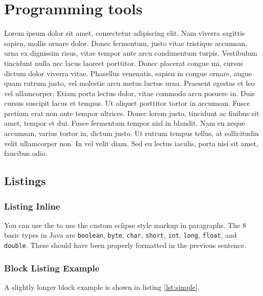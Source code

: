 \chapter{Programming tools}

Lorem ipsum dolor sit amet, consectetur adipiscing elit. Nam viverra sagittis sapien, mollis ornare dolor. Donec fermentum, justo vitae tristique accumsan, urna ex dignissim risus, vitae tempor ante arcu condimentum turpis. Vestibulum tincidunt nulla nec lacus laoreet porttitor. Donec placerat congue mi, cursus dictum dolor viverra vitae. Phasellus venenatis, sapien in congue ornare, augue quam rutrum justo, vel molestie arcu metus luctus urna. Praesent egestas et leo vel ullamcorper. Etiam porta lectus dolor, vitae commodo arcu posuere in. Duis cursus suscipit lacus et tempus. Ut aliquet porttitor tortor in accumsan. Fusce pretium erat non ante tempor ultrices. Donec lorem justo, tincidunt ac finibus sit amet, tempor et dui. Fusce fermentum tempor nisl in blandit. Nam eu neque accumsan, varius tortor in, dictum justo. Ut rutrum tempus tellus, at sollicitudin velit ullamcorper non. In vel velit diam. Sed eu lectus iaculis, porta nisi sit amet, faucibus odio.

\section{Listings}


	\subsection*{Listing Inline}
	
	\lstset{breaklines=false}
	
	You can use the  to use the custom
	eclipse style markup in paragraphs.  The 8 basic types in Java are
	\lstinline$boolean$, \lstinline$byte$, \lstinline$char$,
	\lstinline$short$, \lstinline$int$, \lstinline$long$,
	\lstinline$float$, and \lstinline$double$. These should have been
	properly formatted in the previous sentence.
	
	\lstset{breaklines=true}
	
	\subsection*{Block Listing Example}
	
	A slightly longer block example is shown in listing \ref{lst:simple}.
	

